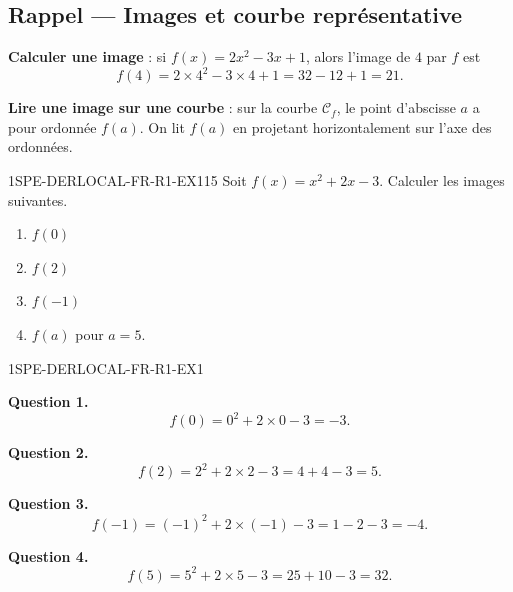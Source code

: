 

\subsection*{Rappel — Images et courbe représentative}

\textbf{Calculer une image} : si $f(x) = 2x^2 - 3x + 1$, alors l'image de $4$ par $f$ est
\[
  f(4) = 2 \times 4^2 - 3 \times 4 + 1 = 32 - 12 + 1 = 21.
\]

\textbf{Lire une image sur une courbe} : sur la courbe $\mathcal{C}_f$, le point d'abscisse $a$ a pour ordonnée $f(a)$. On lit $f(a)$ en projetant horizontalement sur l'axe des ordonnées.


\begin{exercice}{1SPE-DERLOCAL-FR-R1-EX1}{1}{5}
Soit $f(x) = x^2 + 2x - 3$. Calculer les images suivantes.
\begin{enumerate}
  \item $f(0)$
  \item $f(2)$
  \item $f(-1)$
  \item $f(a)$ pour $a = 5$.
\end{enumerate}
\end{exercice}


\begin{corrige}{1SPE-DERLOCAL-FR-R1-EX1}


\textbf{Question 1.}
\[
f(0) = 0^2 + 2 \times 0 - 3 = -3.
\]

\textbf{Question 2.}
\[
f(2) = 2^2 + 2 \times 2 - 3 = 4 + 4 - 3 = 5.
\]

\textbf{Question 3.}
\[
f(-1) = (-1)^2 + 2 \times (-1) - 3 = 1 - 2 - 3 = -4.
\]

\textbf{Question 4.}
\[
f(5) = 5^2 + 2 \times 5 - 3 = 25 + 10 - 3 = 32.
\]

\end{corrige}

